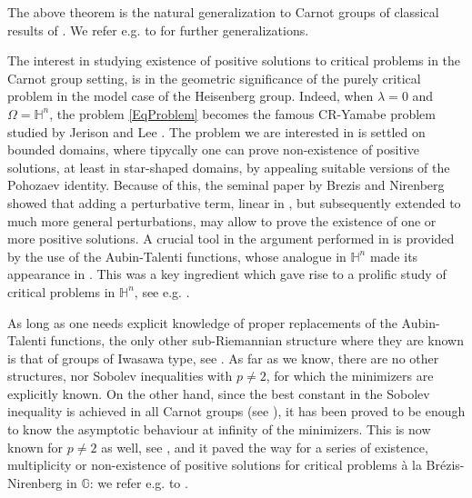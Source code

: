 \documentclass[11pt]{amsart}
\numberwithin{equation}{section} %
\theoremstyle{definition}
\begin{document}
The above theorem is the natural generalization to Carnot groups of classical results of \cite{ABC}. We refer e.g. to \cite{BESS,CCP,CoPe,BV} for further generalizations. 


The interest in studying existence of positive solutions to critical problems in the Carnot group setting,
 is in the geometric significance of the purely critical problem in the model case of the Heisenberg group.
 Indeed, when $\lambda =0$ and $\Omega = \mathbb{H}^n$, the problem \eqref{EqProblem} becomes the famous CR-Yamabe problem studied by Jerison and Lee \cite{JerisonLee,JerisonLee2,JerisonLee3}. The problem  we are interested in is settled on bounded domains, where tipycally one can prove non-existence of positive solutions, at least in star-shaped domains, by appealing suitable versions of the Pohozaev identity. Because of this, the seminal paper by Brezis and Nirenberg \cite{BN} showed that adding a perturbative term, linear in \cite{BN}, but subsequently extended to much more general perturbations, may allow to prove the existence of one or more positive solutions. A crucial tool in the argument performed in \cite{BN} is provided by the use of the Aubin-Talenti functions, whose analogue in $\mathbb{H}^n$ made its appearance in \cite{JerisonLee2}. This was a key ingredient which gave rise to a prolific study of critical problems in $\mathbb{H}^n$, see e.g. \cite{Citti, GaLa, Ugu1, CitUg, MaUg, FelliUgu, MaMaPi, PaPiTe}.

As long as one needs explicit knowledge of proper replacements of the Aubin-Talenti functions, the only other sub-Riemannian structure where they are known is that of groups of Iwasawa type, see \cite{GaroVa2, GaroVa}. As far as we know, there are no other structures, nor Sobolev inequalities with $p\neq 2$, for which the minimizers are explicitly known. 
On the other hand, since the best constant in the Sobolev inequality is achieved in all Carnot groups (see \cite{GaroVa2}), it has been proved to be enough to know  the asymptotic behaviour at infinity of the minimizers. This is now known for $p\neq 2$ as well, see \cite{Loiudice3}, and it paved the way for a series of 
existence, multiplicity or non-existence of positive solutions for critical problems  à la Br\'{e}zis-Nirenberg in $\mathbb{G}$: we refer e.g. to \cite{BoUg, Loiudice1, Loiudice2, Loiudice4, BiGaVe}.

\medskip
\end{document}
